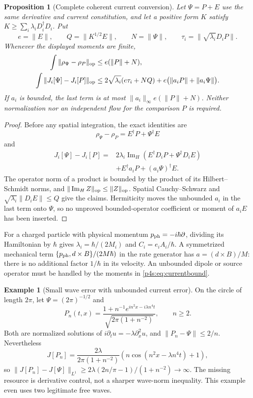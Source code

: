 \documentclass[11pt]{article}
\numberwithin{equation}{section}
\newtheorem{proposition}[theorem]{Proposition}
\theoremstyle{definition}
\newtheorem{example}[theorem]{Example}
\theoremstyle{remark}
\begin{document}
\begin{proposition}[Complete coherent current conversion]
\label{p4s:prop:current}
Let $\Psi=P+E$ use the same derivative and current constitution, and let
a positive form $K$ satisfy
$K\geq\sum_i\lambda_iD_i^\dagger D_i$. Put
\[
 e=\|E\|,\qquad Q=\|K^{1/2}E\|,\qquad
 N=\|\Psi\|,\qquad \tau_i=\|\sqrt{\lambda_i}D_iP\|.
\]
Whenever the displayed moments are finite,
\begin{align}
 \int\|\rho_\Psi-\rho_P\|_{\rm op}
   &\leq e(\|P\|+N),\label{p4s:eq:density}\\
 \int\|J_i[\Psi]-J_i[P]\|_{\rm op}
   &\leq2\sqrt{\lambda_i}(e\tau_i+NQ)
          +e\bigl(\|a_iP\|+\|a_i\Psi\|\bigr).
          \label{p4s:eq:currentbound}
\end{align}
If $a_i$ is bounded, the last term is at most
$\|a_i\|_\infty e(\|P\|+N)$. Neither normalization nor an
independent flow for the comparison $P$ is required.
\end{proposition}
\begin{proof}
Before any spatial integration, the exact identities are
\[
 \rho_\Psi-\rho_P=E^\dagger P+\Psi^\dagger E
\]
and
\begin{align*}
 J_i[\Psi]-J_i[P]
  ={}&2\lambda_i\operatorname{Im}_{H}
       \left(E^\dagger D_iP+\Psi^\dagger D_iE\right)\\
    &+E^\dagger a_iP+(a_i\Psi)^\dagger E .
\end{align*}
The operator norm of a product is bounded by the product of its
Hilbert--Schmidt norms, and
$\|\operatorname{Im}_{H}Z\|_{\rm op}\leq\|Z\|_{\rm op}$.
Spatial Cauchy--Schwarz and
$\sqrt{\lambda_i}\|D_iE\|\leq Q$ give the claims.
Hermiticity moves the unbounded $a_i$ in the last term onto $\Psi$,
so no unproved bounded-operator coefficient or moment of $a_iE$
has been inserted.
\end{proof}

For a charged particle with physical momentum
$p_{\rm ph}=-i\hbar\partial$, dividing its Hamiltonian by $\hbar$
gives $\lambda_i=\hbar/(2M_i)$ and
$C_i=e_iA_i/\hbar$. A symmetrized mechanical term
$\{p_{\rm ph},d\times B\}/(2M\hbar)$ in the rate generator has
$a=(d\times B)/M$: there is no additional factor $1/\hbar$ in its
velocity. An unbounded dipole or source operator must be handled by the
moments in \eqref{p4s:eq:currentbound}.

\begin{example}[Small wave error with unbounded current error]
\label{p4s:ex:norm}
On the circle of length $2\pi$, let
$\Psi=(2\pi)^{-1/2}$ and
\[
 P_n(t,x)=
 \frac{1+n^{-1}e^{in^2x-i\lambda n^4t}}
      {\sqrt{2\pi(1+n^{-2})}},\qquad n\geq2 .
\]
Both are normalized solutions of $i\partial_tu=-\lambda\partial_x^2u$,
and $\|P_n-\Psi\|\leq2/n$. Nevertheless
\[
 J[P_n]=\frac{2\lambda}{2\pi(1+n^{-2})}
              \left(n\cos(n^2x-\lambda n^4t)+1\right),
\]
so
$\|J[P_n]-J[\Psi]\|_{L^1}
\geq2\lambda(2n/\pi-1)/(1+n^{-2})\to\infty$.
The missing resource is derivative control, not a sharper wave-norm
inequality. This example even uses two legitimate free waves.
\end{example}
\end{document}
